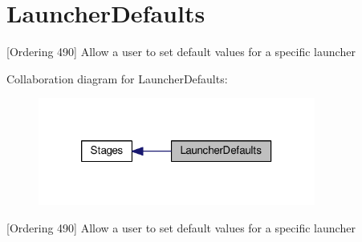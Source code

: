 \hypertarget{group__LauncherDefaults}{\section{Launcher\-Defaults}
\label{group__LauncherDefaults}
}


\mbox{[}Ordering 490\mbox{]} Allow a user to set default values for a specific launcher  


Collaboration diagram for Launcher\-Defaults\-:
\nopagebreak
\begin{figure}[H]
\begin{center}
\leavevmode
\includegraphics[width=258pt]{group__LauncherDefaults}
\end{center}
\end{figure}
\mbox{[}Ordering 490\mbox{]} Allow a user to set default values for a specific launcher 